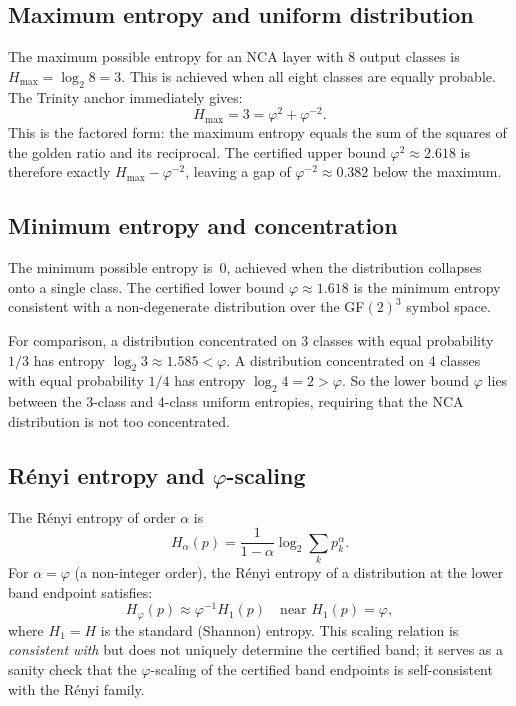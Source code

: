 \subsection{Maximum entropy and uniform distribution}
\label{subsec:entropy-max}

The maximum possible entropy for an NCA layer with 8 output classes
is \(H_\mathrm{max} = \log_2 8 = 3\).  This is achieved when all
eight classes are equally probable.  The Trinity anchor immediately
gives:
\[
  H_\mathrm{max} = 3 = \varphi^2 + \varphi^{-2}.
\]
This is the factored form: the maximum entropy equals the sum of the
squares of the golden ratio and its reciprocal.  The certified upper
bound \(\varphi^2 \approx 2.618\) is therefore exactly
\(H_\mathrm{max} - \varphi^{-2}\), leaving a gap of \(\varphi^{-2}
\approx 0.382\) below the maximum.

\subsection{Minimum entropy and concentration}
\label{subsec:entropy-min}

The minimum possible entropy is~0, achieved when the distribution
collapses onto a single class.  The certified lower bound
\(\varphi \approx 1.618\) is the minimum entropy consistent with a
non-degenerate distribution over the GF\((2)^3\) symbol space.

For comparison, a distribution concentrated on 3 classes with equal
probability \(1/3\) has entropy \(\log_2 3 \approx 1.585 < \varphi\).
A distribution concentrated on 4 classes with equal probability
\(1/4\) has entropy \(\log_2 4 = 2 > \varphi\).  So the lower bound
\(\varphi\) lies between the 3-class and 4-class uniform entropies,
requiring that the NCA distribution is not too concentrated.

\subsection{Rényi entropy and \texorpdfstring{$\varphi$}{φ}-scaling}
\label{subsec:entropy-renyi}

The Rényi entropy of order \(\alpha\) is
\[
  H_\alpha(p) = \frac{1}{1-\alpha} \log_2 \sum_k p_k^\alpha.
\]
For \(\alpha = \varphi\) (a non-integer order), the Rényi entropy of
a distribution at the lower band endpoint satisfies:
\[
  H_\varphi(p) \approx \varphi^{-1} H_1(p)
  \quad \text{near } H_1(p) = \varphi,
\]
where \(H_1 = H\) is the standard (Shannon) entropy.  This scaling
relation is \emph{consistent with} but does not uniquely determine
the certified band; it serves as a sanity check that the
\(\varphi\)-scaling of the certified band endpoints is self-consistent
with the Rényi family.

